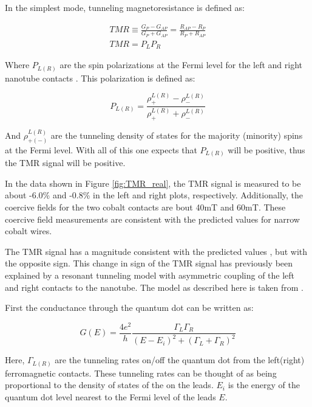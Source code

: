 In the simplest mode, tunneling magnetoresistance is defined as:

\begin{align}
    TMR \equiv \frac{G_P - G_{AP}}{G_P + G_{AP}} = \frac{R_{AP} - R_{P}}{R_P + R_{AP}} \\
    TMR = P_L P_R \label{eq:basic_tmr}
\end{align}

Where $P_{L(R)}$ are the spin polarizations at the Fermi level for the left and right nanotube contacts \cite{Maekawa1982}. This polarization is defined as:

\begin{equation}
    P_{L(R)} = \frac{\rho^{L(R)}_{+} - \rho^{L(R)}_{-}}{\rho^{L(R)}_{+} + \rho^{L(R)}_{-}}
\end{equation}

And $\rho^{L(R)}_{+(-)}$ are the tunneling density of states for the majority (minority) spins at the Fermi level. With all of this one expects that $P_{L(R)}$ will be positive, thus the TMR signal will be positive.

In the data shown in Figure \ref{fig:TMR_real}, the TMR signal is measured to be about -6.0\% and -0.8\% in the left and right plots, respectively. Additionally, the coercive fields for the two cobalt contacts are bout 40mT and 60mT. These coercive field measurements are consistent with the predicted values for narrow cobalt wires.

The TMR signal has a magnitude consistent with the predicted values \cite{Maekawa1982}, but with the opposite sign. This change in sign of the TMR signal has previously been explained by a resonant tunneling model with asymmetric coupling of the left and right contacts to the nanotube. The model as described here is taken from \cite{Tsymbal2003}.

First the conductance through the quantum dot can be written as:

\begin{equation}
\label{eq:tunnel_conductance}
    G(E) = \frac{4e^2}{h} \frac{\Gamma_L \Gamma_R}{(E-E_i)^2 + (\Gamma_L + \Gamma_R)^2}
\end{equation}

Here, $\Gamma_{L(R)}$ are the tunneling rates on/off the quantum dot from the left(right) ferromagnetic contacts. These tunneling rates can be thought of as being proportional to the density of states of the on the leads. $E_i$ is the energy of the quantum dot level nearest to the Fermi level of the leads $E$. 

